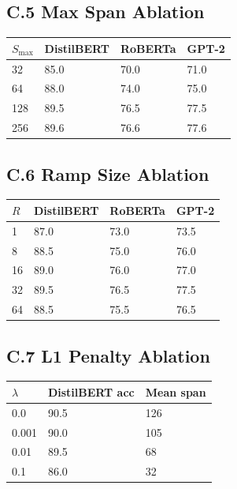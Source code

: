 \subsection{C.5 Max Span Ablation}

\begin{table}[H]
\centering
\small
\begin{tabular}{llll}
\toprule
\textbf{$S_\text{max}$} & \textbf{DistilBERT} & \textbf{RoBERTa} & \textbf{GPT-2} \\
\midrule
32 & 85.0 & 70.0 & 71.0 \\
64 & 88.0 & 74.0 & 75.0 \\
128 & 89.5 & 76.5 & 77.5 \\
256 & 89.6 & 76.6 & 77.6 \\
\bottomrule
\end{tabular}
\end{table}

\subsection{C.6 Ramp Size Ablation}

\begin{table}[H]
\centering
\small
\begin{tabular}{llll}
\toprule
\textbf{$R$} & \textbf{DistilBERT} & \textbf{RoBERTa} & \textbf{GPT-2} \\
\midrule
1 & 87.0 & 73.0 & 73.5 \\
8 & 88.5 & 75.0 & 76.0 \\
16 & 89.0 & 76.0 & 77.0 \\
32 & 89.5 & 76.5 & 77.5 \\
64 & 88.5 & 75.5 & 76.5 \\
\bottomrule
\end{tabular}
\end{table}

\subsection{C.7 L1 Penalty Ablation}

\begin{table}[H]
\centering
\small
\begin{tabular}{lll}
\toprule
\textbf{$\lambda$} & \textbf{DistilBERT acc} & \textbf{Mean span} \\
\midrule
0.0 & 90.5 & 126 \\
0.001 & 90.0 & 105 \\
0.01 & 89.5 & 68 \\
0.1 & 86.0 & 32 \\
\bottomrule
\end{tabular}
\end{table}


